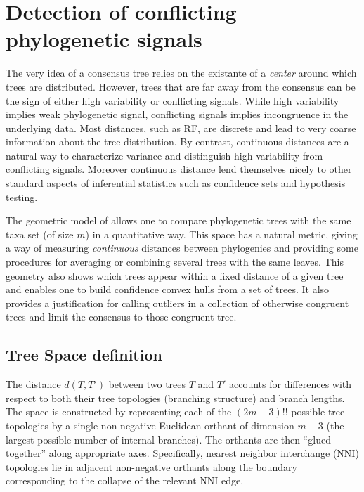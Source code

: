 \section{Detection of conflicting phylogenetic signals} \label{sec:extensions}

The very idea of a consensus tree relies on the existante of a \emph{center} around which trees are distributed. However, trees that are far away from the consensus can be the sign of either high variability or conflicting signals. While high variability implies weak phylogenetic signal, conflicting  signals implies incongruence in the underlying data. Most distances, such as RF, are discrete and lead to very coarse information about the tree distribution. By contrast, continuous distances are a natural way to characterize variance and distinguish high variability from conflicting signals. Moreover continuous distance lend themselves nicely to other standard aspects of inferential statistics such as confidence sets and hypothesis testing.


The  geometric  model of \citet{Billera2001} allows one to compare phylogenetic trees with the same taxa set (of size $m$) in a quantitative way. This  space  has  a  natural  metric, giving a way of measuring \emph{continuous} distances between phylogenies and providing some procedures for averaging or combining several trees with the same leaves. This geometry also shows which trees appear within a fixed distance of a given tree and enables one to build confidence convex hulls from a set of trees. It also provides a justification for calling outliers in a collection of otherwise congruent trees and limit the consensus to those congruent tree.

\subsection{Tree Space definition} \label{sec:Tree-distances}
 The distance $d(T,T')$ between two trees $T$ and $T'$ accounts for differences with respect to both their tree topologies (branching structure) and branch lengths. The space is constructed by representing each of the $(2m-3)!!$ possible tree topologies by a single non-negative Euclidean orthant of dimension $m-3$ (the largest possible number of internal branches). The orthants are then “glued together” along appropriate axes. Specifically, nearest neighbor interchange (NNI) topologies lie in adjacent non-negative orthants along the boundary corresponding to the collapse of the relevant NNI edge.

